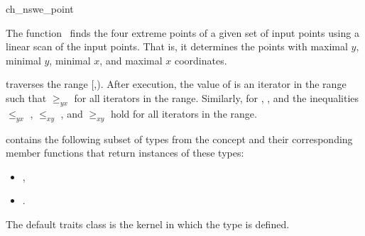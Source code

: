 

\begin{ccRefFunction}{ch_nswe_point}  %

\ccDefinition
  
The function \ccRefName\ finds the four extreme points of a given set  
of input points using a linear scan of the input points.  
That is, it determines the points with maximal $y$, minimal $y$,
minimal $x$, and maximal $x$ coordinates.


           {traverses the range [,).
            After execution, the value of
             is an iterator in the range such that  $\ge_{yx}$
             for all iterators  in the range. Similarly, for
            , , and  the inequalities  $\le_{yx}$
            ,  $\le_{xy}$ , and 
            $\ge_{xy}$  hold for all iterators
             in the range.}


 contains the following subset of types from
the concept  and their corresponding member
functions that return instances of these types:
            \begin{itemize}
                \item {}, 
                \item {}.
            \end{itemize}

The default traits class  is the kernel in which the
type  is defined.

\ccSeeAlso

 \\
 \\
 \\
 \\
 \\

\end{ccRefFunction}


